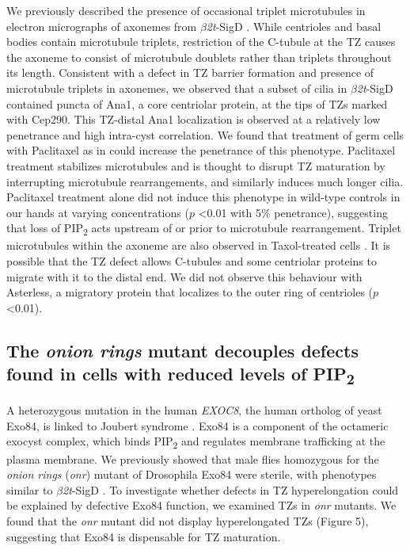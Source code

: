 \documentclass[12pt, twoside, letterpaper]{article}
\newcommand{\PIP}{PIP\textsubscript{2}}
\newcommand{\sigd}{$\beta$\textit{2t}-SigD}
\begin{document}
We previously described the presence of occasional triplet microtubules
in electron micrographs of axonemes from \sigd{} \citep{wei2008depletion}.
While centrioles and basal bodies contain microtubule triplets,
restriction of the C-tubule at the TZ causes the axoneme to
consist of microtubule doublets rather than triplets throughout its length.
Consistent with a defect in TZ barrier formation and presence of
microtubule triplets in axonemes,
we observed that a subset of cilia in \sigd{}
contained puncta of Ana1, a core centriolar protein, at the tips
of TZs marked with Cep290.
This TZ-distal Ana1 localization is observed at a relatively low penetrance
and high intra-cyst correlation.
We found that treatment of germ cells with Paclitaxel as in \citep{riparbelli2013unique}
could increase the penetrance of this phenotype.
Paclitaxel treatment stabilizes microtubules and is thought to disrupt TZ maturation
by interrupting microtubule rearrangements, and similarly induces much longer cilia.
Paclitaxel treatment alone did not induce this phenotype in wild-type controls in our hands
at varying concentrations ($p$ <0.01 with 5\% penetrance),
suggesting that loss of \PIP{} acts upstream of or prior to microtubule rearrangement.
Triplet microtubules within the axoneme are also observed in Taxol-treated cells \citep{riparbelli2013unique}.
It is possible that the TZ defect allows C-tubules and some centriolar proteins
to migrate with it to the distal end.
We did not observe this behaviour with Asterless,
a migratory protein that localizes to the outer
ring of centrioles ($p$ <0.01).

\subsection{The \textit{onion rings} mutant decouples defects found in cells with reduced levels of \PIP{}}
A heterozygous mutation in the human \textit{EXOC8},
the human ortholog of yeast Exo84, is linked to
Joubert syndrome \citep{dixon2012exome}.
Exo84 is a component of the octameric exocyst complex, which binds
\PIP{} and regulates membrane trafficking at the plasma membrane.
We previously showed that male flies homozygous for the \textit{onion rings}
(\textit{onr}) mutant of Drosophila Exo84 were sterile, with phenotypes
similar to \sigd{} \citep{wei2008depletion}.
To investigate whether defects in TZ hyperelongation could be explained by
defective Exo84 function, we examined TZs in \textit{onr} mutants.
We found that the \textit{onr} mutant did not display hyperelongated TZs (Figure 5),
suggesting that Exo84 is dispensable for TZ maturation.
\end{document}
